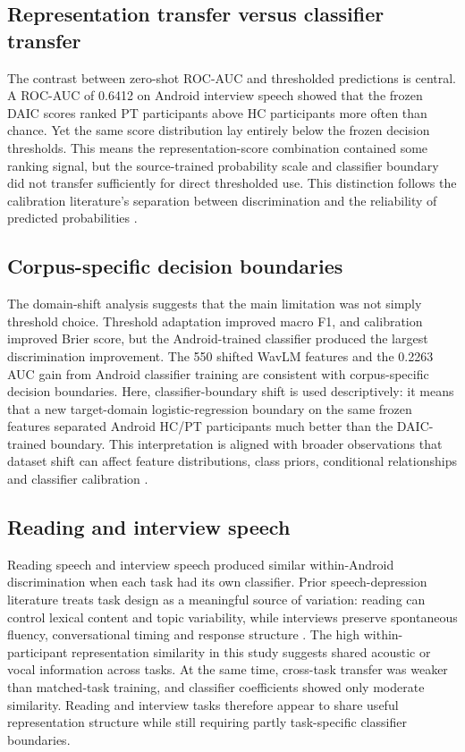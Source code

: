 \documentclass[lettersize,journal]{IEEEtran}
\begin{document}
\subsection{Representation transfer versus classifier transfer}

The contrast between zero-shot ROC-AUC and thresholded predictions is central. A ROC-AUC of 0.6412 on Android interview speech showed that the frozen DAIC scores ranked PT participants above HC participants more often than chance. Yet the same score distribution lay entirely below the frozen decision thresholds. This means the representation-score combination contained some ranking signal, but the source-trained probability scale and classifier boundary did not transfer sufficiently for direct thresholded use. This distinction follows the calibration literature's separation between discrimination and the reliability of predicted probabilities \cite{niculescuMizil2005probabilities,vanCalster2019calibration}.

\subsection{Corpus-specific decision boundaries}

The domain-shift analysis suggests that the main limitation was not simply threshold choice. Threshold adaptation improved macro F1, and calibration improved Brier score, but the Android-trained classifier produced the largest discrimination improvement. The 550 shifted WavLM features and the 0.2263 AUC gain from Android classifier training are consistent with corpus-specific decision boundaries. Here, classifier-boundary shift is used descriptively: it means that a new target-domain logistic-regression boundary on the same frozen features separated Android HC/PT participants much better than the DAIC-trained boundary. This interpretation is aligned with broader observations that dataset shift can affect feature distributions, class priors, conditional relationships and classifier calibration \cite{morenoTorres2012datasetShift,vanCalster2019calibration}.

\subsection{Reading and interview speech}

Reading speech and interview speech produced similar within-Android discrimination when each task had its own classifier. Prior speech-depression literature treats task design as a meaningful source of variation: reading can control lexical content and topic variability, while interviews preserve spontaneous fluency, conversational timing and response structure \cite{tao2023androids,tao2023featureCorrelation,leal2025survey}. The high within-participant representation similarity in this study suggests shared acoustic or vocal information across tasks. At the same time, cross-task transfer was weaker than matched-task training, and classifier coefficients showed only moderate similarity. Reading and interview tasks therefore appear to share useful representation structure while still requiring partly task-specific classifier boundaries.
\end{document}
